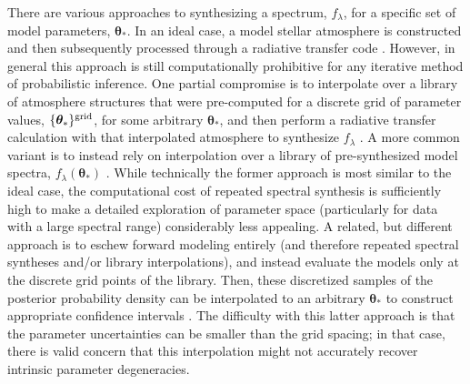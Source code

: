 \documentclass[iop,floatfix]{emulateapj}
\newcommand{\flam}{f_\lambda}
\newcommand{\vt}{ {\bm \theta}}
\begin{document}
There are various approaches to synthesizing a spectrum, $f_{\lambda}$, for a specific set of model
parameters, $\vt_{\ast}$.  In an ideal case, a model stellar atmosphere is constructed and then 
subsequently processed through a radiative transfer code \citep[e.g.,][]{kurucz93,hauschildt99}.  
However, in general this approach is still computationally prohibitive for any iterative method of 
probabilistic inference.  One partial compromise is to interpolate over a library of atmosphere 
structures that were pre-computed for a discrete grid of parameter values, $\{\vt_{\ast}\}^{\rm 
grid}$, for some arbitrary $\vt_{\ast}$, and then perform a radiative transfer calculation with 
that interpolated atmosphere to synthesize $\flam$ \citep[e.g., as for {\tt SME};][]{valenti96}.  A 
more common variant is to instead rely on interpolation over a library of pre-synthesized model 
spectra, $\flam(\vt_{\ast})$ \citep[e.g.,][]{castelli04,allard12,husser13}.  While technically the 
former approach is most similar to the ideal case, the computational cost of repeated spectral 
synthesis is sufficiently high to make a detailed exploration of parameter space (particularly for 
data with a large spectral range) considerably less appealing.  A related, but different approach 
is to eschew forward modeling entirely (and therefore repeated spectral syntheses and/or library 
interpolations), and instead evaluate the models only at the discrete grid points of the library.  
Then, these discretized samples of the posterior probability density can be interpolated to an 
arbitrary $\vt_{\ast}$ to construct appropriate confidence intervals \citep[similar to the method 
of {\tt SPC};][]{buchhave12}.  The difficulty with this latter approach is that the parameter 
uncertainties can be smaller than the grid spacing; in that case, there is valid concern that this 
interpolation might not accurately recover intrinsic parameter degeneracies.
\end{document}
